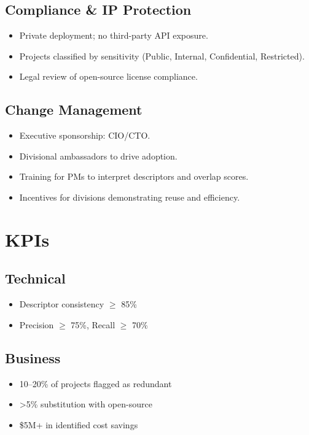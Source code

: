 \documentclass[12pt,a4paper]{article}
\begin{document}
\subsection{Compliance \& IP Protection}
\begin{itemize}[leftmargin=2em]
    \item Private deployment; no third-party API exposure.  
    \item Projects classified by sensitivity (Public, Internal, Confidential, Restricted).  
    \item Legal review of open-source license compliance.  
\end{itemize}

\subsection{Change Management}
\begin{itemize}[leftmargin=2em]
    \item Executive sponsorship: CIO/CTO.  
    \item Divisional ambassadors to drive adoption.  
    \item Training for PMs to interpret descriptors and overlap scores.  
    \item Incentives for divisions demonstrating reuse and efficiency.  
\end{itemize}

\section{KPIs}
\subsection{Technical}
\begin{itemize}[leftmargin=2em]
    \item Descriptor consistency $\geq$ 85\%  
    \item Precision $\geq$ 75\%, Recall $\geq$ 70\%  
\end{itemize}

\subsection{Business}
\begin{itemize}[leftmargin=2em]
    \item 10--20\% of projects flagged as redundant  
    \item >5\% substitution with open-source  
    \item \$5M+ in identified cost savings  
\end{itemize}
\end{document}
